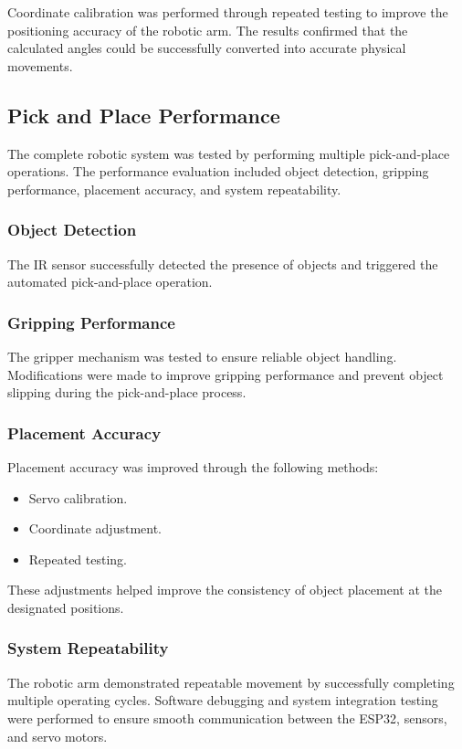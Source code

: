 Coordinate calibration was performed through repeated testing to improve the positioning accuracy of the robotic arm. The results confirmed that the calculated angles could be successfully converted into accurate physical movements.

\subsection{Pick and Place Performance}

The complete robotic system was tested by performing multiple pick-and-place operations. The performance evaluation included object detection, gripping performance, placement accuracy, and system repeatability.

\subsubsection{Object Detection}

The IR sensor successfully detected the presence of objects and triggered the automated pick-and-place operation.

\subsubsection{Gripping Performance}

The gripper mechanism was tested to ensure reliable object handling. Modifications were made to improve gripping performance and prevent object slipping during the pick-and-place process.

\subsubsection{Placement Accuracy}

Placement accuracy was improved through the following methods:

\begin{itemize}
    \item Servo calibration.
    \item Coordinate adjustment.
    \item Repeated testing.
\end{itemize}

These adjustments helped improve the consistency of object placement at the designated positions.

\subsubsection{System Repeatability}

The robotic arm demonstrated repeatable movement by successfully completing multiple operating cycles. Software debugging and system integration testing were performed to ensure smooth communication between the ESP32, sensors, and servo motors.\cite{baby2017pick}

